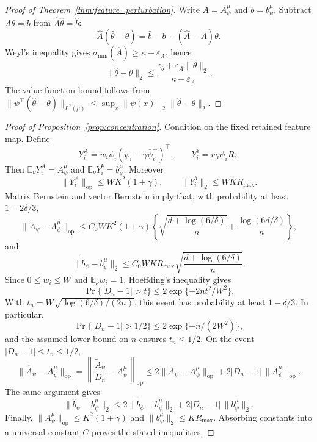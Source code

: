 \documentclass{article}
\newcommand{\E}{\mathbb{E}}
\newcommand{\hatA}{\widehat A}
\newcommand{\hatb}{\widehat b}
\newcommand{\tildeA}{\widetilde A}
\newcommand{\tildeb}{\widetilde b}
\theoremstyle{plain}
\theoremstyle{definition}
\theoremstyle{remark}
\begin{document}
\begin{proof}[Proof of Theorem~\ref{thm:feature_perturbation}]
Write \(A=A^\mu_\psi\) and \(b=b^\mu_\psi\). Subtract
\(A\theta=b\) from \(\hatA\hat\theta=\hatb\):
\[
  \hatA(\hat\theta-\theta)
  =
  \hatb-b-(\hatA-A)\theta .
\]
Weyl's inequality gives
\(\sigma_{\min}(\hatA)\ge\kappa-\varepsilon_A\), hence
\[
  \|\hat\theta-\theta\|_2
  \le
  \frac{\varepsilon_b+\varepsilon_A\|\theta\|_2}{\kappa-\varepsilon_A}.
\]
The value-function bound follows from
\(\|\psi^\top(\hat\theta-\theta)\|_{L^2(\mu)}
\le \sup_x\|\psi(x)\|_2\|\hat\theta-\theta\|_2\).
\end{proof}

\begin{proof}[Proof of Proposition~\ref{prop:concentration}]
Condition on the fixed retained feature map. Define
\[
  Y_i^A=w_i\psi_i(\psi_i-\gamma\bar\psi_i^+)^\top,
  \qquad
  Y_i^b=w_i\psi_iR_i.
\]
Then \(\E_\nu Y_i^A=A^\mu_\psi\) and
\(\E_\nu Y_i^b=b^\mu_\psi\). Moreover
\[
  \|Y_i^A\|_{\mathrm{op}}\le WK^2(1+\gamma),
  \qquad
  \|Y_i^b\|_2\le WKR_{\max}.
\]
Matrix Bernstein and vector Bernstein imply that, with probability at least
\(1-2\delta/3\),
\[
  \|\tildeA_\psi-A^\mu_\psi\|_{\mathrm{op}}
  \le
  C_0 WK^2(1+\gamma)
  \left\{
    \sqrt{\frac{d+\log(6/\delta)}{n}}
    +
    \frac{\log(6d/\delta)}{n}
  \right\},
\]
and
\[
  \|\tildeb_\psi-b^\mu_\psi\|_2
  \le
  C_0 WKR_{\max}
  \sqrt{\frac{d+\log(6/\delta)}{n}} .
\]
Since \(0\le w_i\le W\) and \(\E_\nu w_i=1\), Hoeffding's inequality gives
\[
  \Pr\{|D_n-1|>t\}
  \le
  2\exp\{-2nt^2/W^2\}.
\]
With \(t_n=W\sqrt{\log(6/\delta)/(2n)}\), this event has probability at
least \(1-\delta/3\). In particular,
\[
  \Pr\{|D_n-1|>1/2\}
  \le
  2\exp\{-n/(2W^2)\},
\]
and the assumed lower bound on \(n\) ensures \(t_n\le1/2\). On the event
\(|D_n-1|\le t_n\le1/2\),
\[
  \|\hatA_\psi-A^\mu_\psi\|_{\mathrm{op}}
  =
  \left\|\frac{\tildeA_\psi}{D_n}-A^\mu_\psi\right\|_{\mathrm{op}}
  \le
  2\|\tildeA_\psi-A^\mu_\psi\|_{\mathrm{op}}
  +
  2|D_n-1|\,\|A^\mu_\psi\|_{\mathrm{op}}.
\]
The same argument gives
\[
  \|\hatb_\psi-b^\mu_\psi\|_2
  \le
  2\|\tildeb_\psi-b^\mu_\psi\|_2
  +
  2|D_n-1|\,\|b^\mu_\psi\|_2.
\]
Finally, \(\|A^\mu_\psi\|_{\mathrm{op}}\le K^2(1+\gamma)\) and
\(\|b^\mu_\psi\|_2\le KR_{\max}\). Absorbing constants into a universal
constant \(C\) proves the stated inequalities.
\end{proof}
\end{document}
